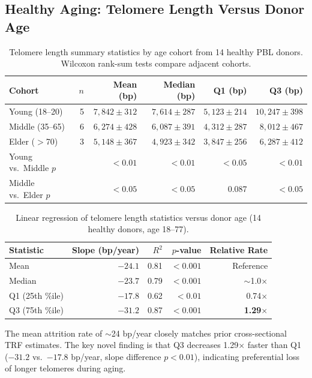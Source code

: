 \documentclass[11pt]{article}
\begin{document}
\subsection{Healthy Aging: Telomere Length Versus Donor Age}

\begin{table}[H]
\centering
\caption{Telomere length summary statistics by age cohort from 14 healthy PBL donors. Wilcoxon rank-sum tests compare adjacent cohorts.}
\label{tab:aging}
\begin{tabular}{lrrrrr}
\toprule
\textbf{Cohort} & \textbf{$n$} & \textbf{Mean (bp)} & \textbf{Median (bp)} & \textbf{Q1 (bp)} & \textbf{Q3 (bp)} \\
\midrule
Young (18--20) & 5 & $7,842 \pm 312$ & $7,614 \pm 287$ & $5,123 \pm 214$ & $10,247 \pm 398$ \\
Middle (35--65) & 6 & $6,274 \pm 428$ & $6,087 \pm 391$ & $4,312 \pm 287$ & $8,012 \pm 467$ \\
Elder ($>$70) & 3 & $5,148 \pm 367$ & $4,923 \pm 342$ & $3,847 \pm 256$ & $6,287 \pm 412$ \\
\midrule
Young vs.\ Middle $p$ & & $<0.01$ & $<0.01$ & $<0.05$ & $<0.01$ \\
Middle vs.\ Elder $p$ & & $<0.05$ & $<0.05$ & 0.087 & $<0.05$ \\
\bottomrule
\end{tabular}
\end{table}

\begin{table}[H]
\centering
\caption{Linear regression of telomere length statistics versus donor age (14 healthy donors, age 18--77).}
\label{tab:slopes}
\begin{tabular}{lrrrr}
\toprule
\textbf{Statistic} & \textbf{Slope (bp/year)} & \textbf{$R^2$} & \textbf{$p$-value} & \textbf{Relative Rate} \\
\midrule
Mean & $-24.1$ & 0.81 & $<0.001$ & Reference \\
Median & $-23.7$ & 0.79 & $<0.001$ & $\sim$1.0$\times$ \\
Q1 (25th \%ile) & $-17.8$ & 0.62 & $<0.01$ & 0.74$\times$ \\
Q3 (75th \%ile) & $-31.2$ & 0.87 & $<0.001$ & \textbf{1.29$\times$} \\
\bottomrule
\end{tabular}
\end{table}

The mean attrition rate of $\sim$24 bp/year closely matches prior cross-sectional TRF estimates. The key novel finding is that Q3 decreases 1.29$\times$ faster than Q1 ($-31.2$ vs.\ $-17.8$ bp/year, slope difference $p < 0.01$), indicating preferential loss of longer telomeres during aging.
\end{document}
